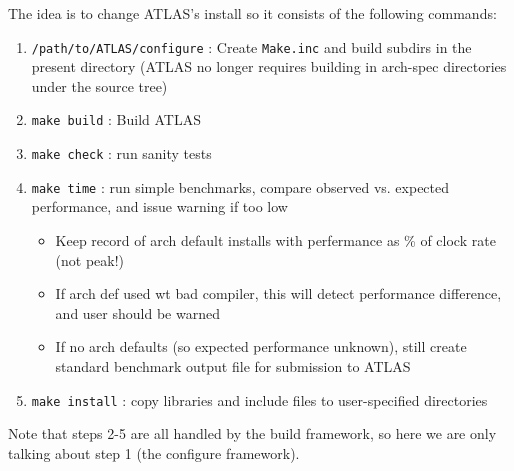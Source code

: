 \documentclass[11pt]{article}
\newcommand{\Wskip}[1]{ }
\begin{document}
The idea is to change ATLAS's install so it consists of the following
commands:
\begin{enumerate}
\item {\tt /path/to/ATLAS/configure} : Create {\tt Make.inc} and build subdirs
      in the present directory (ATLAS no longer requires building in arch-spec
      directories under the source tree)
\item {\tt make build} : Build ATLAS
\item {\tt make check} : run sanity tests
\item {\tt make time} : run simple benchmarks, compare observed vs. expected
      performance, and issue warning if too low
   \begin{itemize}
   \item Keep record of arch default installs with perfermance as \% of
         clock rate (not peak!)
   \item If arch def used wt bad compiler, this will detect performance
         difference, and user should be warned
   \item If no arch defaults (so expected performance unknown), still create
         standard benchmark output file for submission to ATLAS
   \end{itemize}
\item {\tt make install} : copy libraries and include files to user-specified
      directories
\end{enumerate}

Note that steps 2-5 are all handled by the build framework, so here we
are only talking about step 1 (the configure framework).

\Wskip{
\subsection{Weaknesses in {\tt spew}/{\tt config}}
\begin{enumerate}
\item Needs a flag for the {\tt delay} variable
\item Needs correct lib setup:
   \begin{itemize}
   \item Spew \& config flags for BLASlib, FBLASlib, FLAPACKlib, extra syslibs.
   \item config.c needs an updated GetSysLib, output passed to spew 
         via extra syslibs.
   \item Need flags for archiver, archflags, and ranlib 
         (also table lookup in config.c)
   \end{itemize}
\end{enumerate}
}
\end{document}
